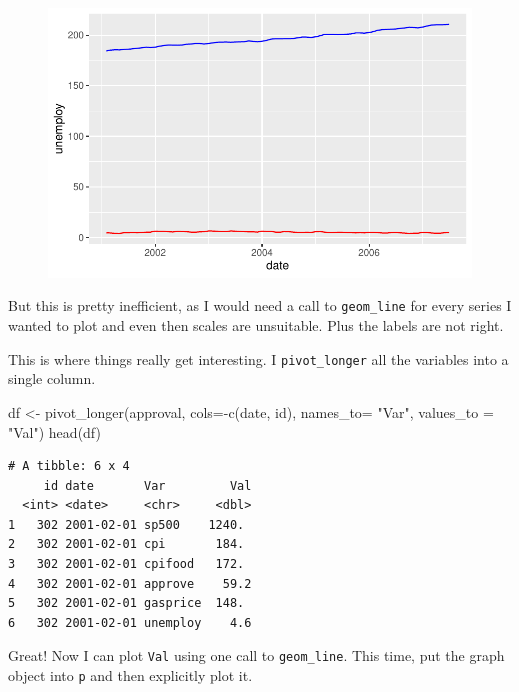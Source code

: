 \documentclass[
  letterpaper,
]{book}
\newenvironment{Shaded}{\begin{snugshade}}{\end{snugshade}}
\newcommand{\AttributeTok}[1]{\textcolor[rgb]{0.40,0.45,0.13}{#1}}
\newcommand{\FunctionTok}[1]{\textcolor[rgb]{0.28,0.35,0.67}{#1}}
\newcommand{\NormalTok}[1]{\textcolor[rgb]{0.00,0.23,0.31}{#1}}
\newcommand{\OtherTok}[1]{\textcolor[rgb]{0.00,0.23,0.31}{#1}}
\newcommand{\SpecialCharTok}[1]{\textcolor[rgb]{0.37,0.37,0.37}{#1}}
\newcommand{\StringTok}[1]{\textcolor[rgb]{0.13,0.47,0.30}{#1}}
\begin{document}
\begin{figure}[H]

{\centering \includegraphics{Appendix1_files/figure-pdf/unnamed-chunk-4-1.pdf}

}

\end{figure}

But this is pretty inefficient, as I would need a call to
\texttt{geom\_line} for every series I wanted to plot and even then
scales are unsuitable. Plus the labels are not right.

This is where things really get interesting. I \texttt{pivot\_longer}
all the variables into a single column.

\begin{Shaded}
\begin{Highlighting}[]
\NormalTok{df }\OtherTok{\textless{}{-}} \FunctionTok{pivot\_longer}\NormalTok{(approval, }\AttributeTok{cols=}\SpecialCharTok{{-}}\FunctionTok{c}\NormalTok{(date, id), }\AttributeTok{names\_to=} \StringTok{"Var"}\NormalTok{, }\AttributeTok{values\_to =} \StringTok{"Val"}\NormalTok{)}
\FunctionTok{head}\NormalTok{(df)}
\end{Highlighting}
\end{Shaded}

\begin{verbatim}
# A tibble: 6 x 4
     id date       Var         Val
  <int> <date>     <chr>     <dbl>
1   302 2001-02-01 sp500    1240. 
2   302 2001-02-01 cpi       184. 
3   302 2001-02-01 cpifood   172. 
4   302 2001-02-01 approve    59.2
5   302 2001-02-01 gasprice  148. 
6   302 2001-02-01 unemploy    4.6
\end{verbatim}

Great! Now I can plot \texttt{Val} using one call to
\texttt{geom\_line}. This time, put the graph object into \texttt{p} and
then explicitly plot it.
\end{document}
